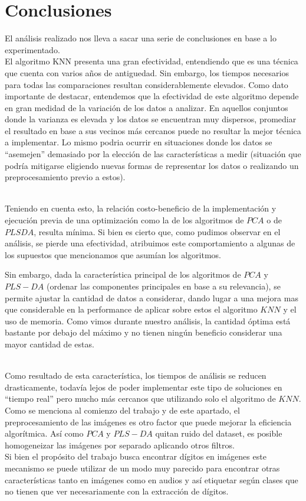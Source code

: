 \section{Conclusiones}
El análisis realizado nos lleva a sacar una serie de conclusiones en base a lo experimentado.
\\
El algoritmo KNN presenta una gran efectividad, entendiendo que es una técnica que cuenta con varios años de antiguedad. Sin embargo, los tiempos necesarios para todas las comparaciones resultan considerablemente elevados.
Como dato importante de destacar, entendemos que la efectividad de este algoritmo depende en gran medidad de la variación de los datos a analizar. En aquellos conjuntos donde la varianza es elevada y los datos se encuentran muy dispersos, promediar el resultado en base a sus vecinos más cercanos puede no resultar la mejor técnica a implementar. Lo mismo podria ocurrir en situaciones donde los datos se ``asemejen''  demasiado por la elección de las características a medir (situación que podría mitigarse eligiendo nuevas formas de representar los datos o realizando un preprocesamiento previo a estos).

\\
Teniendo en cuenta esto, la relación costo-beneficio de la implementación y ejecución previa de una optimización como la de los algoritmos de $PCA$ o de $PLSDA$, resulta mínima. Si bien es cierto que, como pudimos observar en el análisis, se pierde una efectividad, atribuimos este comportamiento a algunas de los supuestos que mencionamos que asumían los algoritmos.

Sin embargo, dada la característica principal de los algoritmos de $PCA$ y $PLS-DA$ (ordenar las componentes principales en base a su relevancia), se permite ajustar la cantidad de datos a considerar, dando lugar a una mejora mas que considerable en la performance de aplicar sobre estos el algoritmo $KNN$ y el uso de memoria. Como vimos durante nuestro análisis, la cantidad óptima está bastante por debajo del máximo y no tienen ningún beneficio considerar una mayor cantidad de estas.

\\
Como resultado de esta característica, los tiempos de análisis se reducen drasticamente, todavía lejos de poder implementar este tipo de soluciones en ``tiempo real'' pero mucho más cercanos que utilizando solo el algoritmo de $KNN$.
\\
Como se menciona al comienzo del trabajo y de este apartado, el preprocesamiento de las imágenes es otro factor que puede mejorar la eficiencia algorítmica. Así como $PCA$ y $PLS-DA$ quitan ruido del dataset, es posible homogeneizar las imágenes por separado aplicando otros filtros.
\\
Si bien el propósito del trabajo busca encontrar dígitos en imágenes este mecanismo se puede utilizar de un modo muy parecido para encontrar otras características tanto en imágenes como en audios y así etiquetar según clases que no tienen que ver necesariamente con la extracción de dígitos.